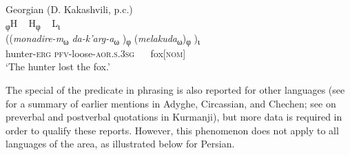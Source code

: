 \documentclass[output=paper,colorlinks,citecolor=brown]{langscibook}
\begin{document}
\ea \label{ex:georgianBroadSVO}
    Georgian (D. Kakashvili, p.c.) \\
    \glll \textup{\textsubscript{φ}H} ~ \textup{H\textsubscript{φ}} ~ \textup{L\textsubscript{ι}} \\
    ((\textit{monadire-m}\textsubscript{ω} \textit{da-k’arg-a}\textsubscript{ω} )\textsubscript{φ} (\textit{melakuda}\textsubscript{ω})\textsubscript{φ} )\textsubscript{ι}\\
    hunter-\textsc{erg} \textsc{pfv}-loose-\textsc{aor}.\textsc{s}.\textsc{3sg} ~~ fox[\textsc{nom}]\\
\glt ‘The hunter lost the fox.'
\z


The special  of the predicate in phrasing is also reported for other languages (see \citealt[771, 780]{borise_tone_2021}{} for a summary of earlier mentions in Adyghe, Circassian, and Chechen; see \citealt[275]{hasan_kurdish_2012} on preverbal and postverbal quotations in Kurmanji), but more data is required in order to qualify these reports. However, this phenomenon does not apply to all  languages of the area, as illustrated below for Persian. 
\end{document}
